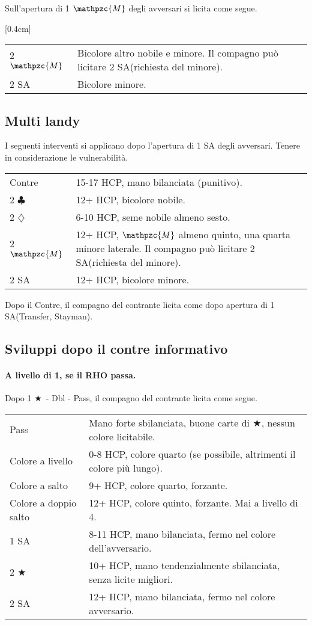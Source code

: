 \documentclass[a4paper,10pt]{article}
\renewcommand{\c}{$\clubsuit$\xspace}
\renewcommand{\d}{$\diamondsuit$\xspace}
\renewcommand{\j}{$\bigstar$\xspace}
\newcommand{\sa}{SA\xspace}
\newcommand{\M}{$\mathpzc{M}$\xspace}
\newcommand{\smallspace}{\vskip0.3cm}
\renewcommand{\tabcolsep}{0.3cm}
\newenvironment{twocol}
  {\smallspace\noindent\begin{tabular}{l p{0.78\textwidth}}}
  {\end{tabular}\smallspace}
\newcommand{\biddingtable}[2][0.4cm]{
  \needspace{1cm}
  \marginnote{
    \scriptsize{
    \def\arraystretch{1.5}
    \renewcommand{\tabcolsep}{0.1cm}
    \begin{tabular}{|>{\centering\arraybackslash}p{0.6cm}>{\centering\arraybackslash}p{0.6cm}>{\centering\arraybackslash}p{0.6cm}>{\centering\arraybackslash}p{0.6cm}|}
      \hline
      #2
    \end{tabular}
    }
  }[#1]
}
\begin{document}
Sull'apertura di 1 \M degli avversari si licita come segue.

\biddingtable{1 \M & * &&}
\begin{twocol}
  2 \M & Bicolore altro nobile e minore. Il compagno può licitare 2 \sa (richiesta del minore).\\
  2 \sa & Bicolore minore.
\end{twocol}

\subsection{Multi landy}

I seguenti interventi si applicano dopo l'apertura di 1 \sa degli avversari. Tenere in considerazione le vulnerabilità.
\begin{twocol}
 Contre & 15-17 HCP, mano bilanciata (punitivo).\\
 2 \c & 12+ HCP, bicolore nobile.\\
 2 \d & 6-10 HCP, seme nobile almeno sesto.\\
 2 \M & 12+ HCP, \M almeno quinto, una quarta minore laterale. Il compagno può licitare 2 \sa (richiesta del minore).\\
 2 \sa & 12+ HCP, bicolore minore.\\
\end{twocol}

Dopo il Contre, il compagno del contrante licita come dopo apertura di 1 \sa (Transfer, Stayman).


\subsection{Sviluppi dopo il contre informativo}

\paragraph{A livello di 1, se il RHO passa.} Dopo 1 \j\ - Dbl - Pass, il compagno del contrante licita come segue.

\begin{twocol}
	Pass & Mano forte sbilanciata, buone carte di \j, nessun colore licitabile. \\
	Colore a livello & 0-8 HCP, colore quarto (se possibile, altrimenti il colore più lungo). \\
	Colore a salto & 9+ HCP, colore quarto, forzante. \\
	Colore a doppio salto & 12+ HCP, colore quinto, forzante. Mai a livello di 4. \\
	1 \sa & 8-11 HCP, mano bilanciata, fermo nel colore dell'avversario. \\
	2 \j & 10+ HCP, mano tendenzialmente sbilanciata, senza licite migliori. \\
	2 \sa & 12+ HCP, mano bilanciata, fermo nel colore avversario. \\
\end{twocol}
\end{document}
